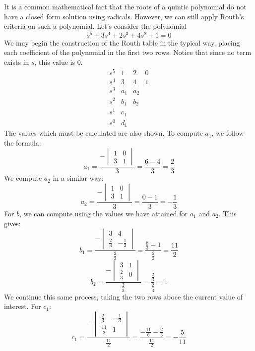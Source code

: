 \begin{example}
    It is a common mathematical fact that the roots of a quintic polynomial do not have a closed form solution using radicals. However, we can still apply Routh's criteria on such a polynomial. Let's consider the polynomial
    $$s^5+3s^4+2s^3+4s^2+1=0$$
    We may begin the construction of the Routh table in the typical way, placing each coefficient of the polynomial in the first two rows. Notice that since no term exists in $s$, this value is $0$.
    $$
    \begin{array}{lccc}
         s^5&1&2&0  \\
         s^4&3&4&1\\
         s^3&a_1&a_2\\
         s^2&b_1&b_2\\
         s^1&c_1\\
         s^0&d_1
    \end{array}
    $$
    The values which must be calculated are also shown. To compute $a_1$, we follow the formula:
    $$a_1=\frac{-\begin{vmatrix}
        1&0\\3&1
    \end{vmatrix}}{3}=\frac{6-4}{3}=\frac{2}{3}$$
    We compute $a_2$ in a similar way:
        $$a_2=\frac{-\begin{vmatrix}
        1&0\\3&1
    \end{vmatrix}}{3}=\frac{0-1}{3}=-\frac{1}{3}$$
    For $b$, we can compute using the values we have attained for $a_1$ and $a_2$. This gives:
        $$b_1=\frac{-\begin{vmatrix}
        3&4\\\frac{2}{3}&-\frac{1}{3}
    \end{vmatrix}}{\frac{2}{3}}=\frac{\frac{8}{3}+1}{\frac{2}{3}}=\frac{11}{2}$$
$$b_2=\frac{-\begin{vmatrix}
        3&1\\\frac{2}{3}&0
    \end{vmatrix}}{\frac{2}{3}}=\frac{\frac{2}{3}}{\frac{2}{3}}=1$$
    We continue this same process, taking the two rows aboce the current value of interest. For $c_1$:
     $$c_1=\frac{-\begin{vmatrix}
        \frac{2}{3}&-\frac{1}{3}\\\frac{11}{2}&1
    \end{vmatrix}}{\frac{11}{2}}=\frac{-\frac{11}{6}-\frac{2}{3}}{\frac{11}{2}}=-\frac{5}{11}$$

\end{example}
